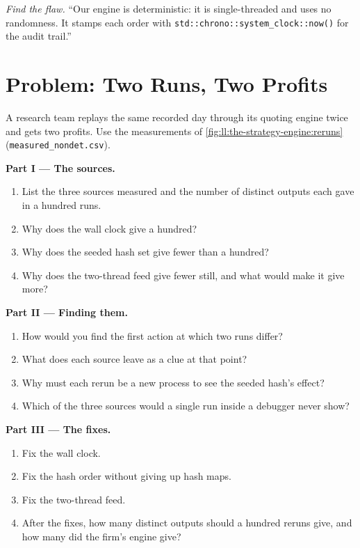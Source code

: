 \begin{exercise}[$\star\star\star$]\label{exo:ll:the-strategy-engine:8}
\emph{Find the flaw.} ``Our engine is deterministic: it is single-threaded and uses no randomness. It stamps each order with
\texttt{std::chrono::system\_clock::now()} for the audit trail.''
\end{exercise}

\section{Problem: Two Runs, Two Profits}

\begin{problem}\label{pb:ll:the-strategy-engine:1}
A research team replays the same recorded day through its quoting engine twice and gets two profits. Use the measurements of
\cref{fig:ll:the-strategy-engine:reruns} (\texttt{measured\_nondet.csv}).

\medskip\noindent\textbf{Part I --- The sources.}
\begin{enumerate}
\item List the three sources measured and the number of distinct outputs each gave in a hundred runs.
\item Why does the wall clock give a hundred?
\item Why does the seeded hash set give fewer than a hundred?
\item Why does the two-thread feed give fewer still, and what would make it give more?
\end{enumerate}

\medskip\noindent\textbf{Part II --- Finding them.}
\begin{enumerate}[resume]
\item How would you find the first action at which two runs differ?
\item What does each source leave as a clue at that point?
\item Why must each rerun be a new process to see the seeded hash's effect?
\item Which of the three sources would a single run inside a debugger never show?
\end{enumerate}

\medskip\noindent\textbf{Part III --- The fixes.}
\begin{enumerate}[resume]
\item Fix the wall clock.
\item Fix the hash order without giving up hash maps.
\item Fix the two-thread feed.
\item After the fixes, how many distinct outputs should a hundred reruns give, and how many did the firm's engine give?
\end{enumerate}


\end{problem}
